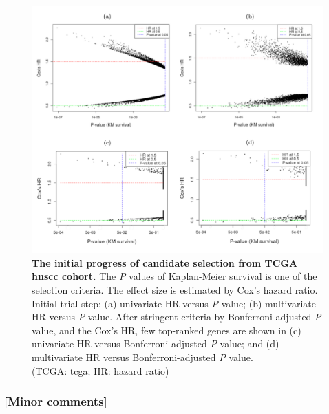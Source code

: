 \documentclass[preprint,12pt]{elsarticle}
\newcommand{\bcaption}[2]{\caption{\textbf{#1} #2}}
\newenvironment{MyColorPar}[1]{%
    \leavevmode\color{#1}\ignorespaces%
}{%
}%
\begin{document}
\begin{MyColorPar}{blue}
\begin{figure}[hbt!]
\label{page21}
\end{figure}


\begin{figure}[hbt!]
\centering
\includegraphics[width=14cm]{Figure2.pdf}
\bcaption{The initial progress of candidate selection from TCGA \acrshort{hnscc} cohort.}{The \textit{P} values of Kaplan-Meier survival is one of the selection criteria.
The effect size is estimated by Cox's hazard ratio.
Initial trial step: (a) univariate HR versus \textit{P} value; (b) multivariate HR versus \textit{P} value.
After stringent criteria by Bonferroni-adjusted \textit{P} value, and the Cox's HR, few top-ranked genes are shown in
(c) univariate HR versus Bonferroni-adjusted \textit{P} value; and (d) multivariate HR versus Bonferroni-adjusted \textit{P} value.\\
(TCGA: \acrlong{tcga}; HR: hazard ratio)}
\label{fig:figure2}
\label{page22}
\end{figure}


\begin{MyColorPar}{black} %
\subsubsection*{[Minor comments]}


\end{MyColorPar}
\end{MyColorPar}
\end{document}

